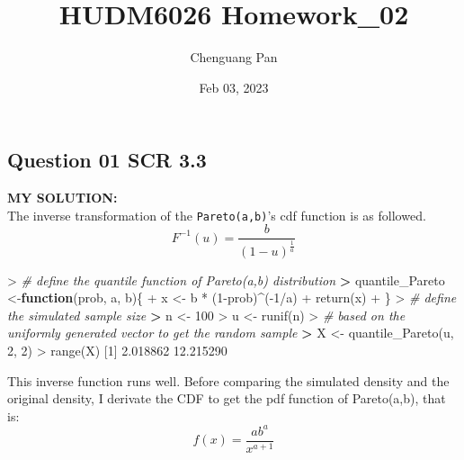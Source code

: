 \documentclass[
]{article}
\title{HUDM6026 Homework\_02}
\author{Chenguang Pan}
\date{Feb 03, 2023}
\newenvironment{Shaded}{\begin{snugshade}}{\end{snugshade}}
\newcommand{\CommentTok}[1]{\textcolor[rgb]{0.56,0.35,0.01}{\textit{#1}}}
\newcommand{\ControlFlowTok}[1]{\textcolor[rgb]{0.13,0.29,0.53}{\textbf{#1}}}
\newcommand{\DecValTok}[1]{\textcolor[rgb]{0.00,0.00,0.81}{#1}}
\newcommand{\ErrorTok}[1]{\textcolor[rgb]{0.64,0.00,0.00}{\textbf{#1}}}
\newcommand{\FloatTok}[1]{\textcolor[rgb]{0.00,0.00,0.81}{#1}}
\newcommand{\FunctionTok}[1]{\textcolor[rgb]{0.00,0.00,0.00}{#1}}
\newcommand{\NormalTok}[1]{#1}
\newcommand{\OtherTok}[1]{\textcolor[rgb]{0.56,0.35,0.01}{#1}}
\newcommand{\SpecialCharTok}[1]{\textcolor[rgb]{0.00,0.00,0.00}{#1}}
\begin{document}
\maketitle

\hypertarget{question-01-scr-3.3}{%
\subsection{Question 01 SCR 3.3}\label{question-01-scr-3.3}}

\textbf{MY SOLUTION:}\\
The inverse transformation of the \texttt{Pareto(a,b)}'s cdf function is
as followed. \[F^{-1}(u)=\frac{b}{(1-u)^\frac{1}{a}} \]

\begin{Shaded}
\begin{Highlighting}[]
\SpecialCharTok{\textgreater{}} \CommentTok{\# define the quantile function of Pareto(a,b) distribution}
\ErrorTok{\textgreater{}}\NormalTok{ quantile\_Pareto }\OtherTok{\textless{}{-}}\ControlFlowTok{function}\NormalTok{(prob, a, b)\{}
\SpecialCharTok{+}\NormalTok{   x }\OtherTok{\textless{}{-}}\NormalTok{ b }\SpecialCharTok{*}\NormalTok{ (}\DecValTok{1}\SpecialCharTok{{-}}\NormalTok{prob)}\SpecialCharTok{\^{}}\NormalTok{(}\SpecialCharTok{{-}}\DecValTok{1}\SpecialCharTok{/}\NormalTok{a)}
\SpecialCharTok{+}   \FunctionTok{return}\NormalTok{(x)}
\SpecialCharTok{+}\NormalTok{ \}}
\SpecialCharTok{\textgreater{}} \CommentTok{\# define the simulated sample size}
\ErrorTok{\textgreater{}}\NormalTok{ n }\OtherTok{\textless{}{-}} \DecValTok{100}
\SpecialCharTok{\textgreater{}}\NormalTok{ u }\OtherTok{\textless{}{-}} \FunctionTok{runif}\NormalTok{(n)}
\SpecialCharTok{\textgreater{}} \CommentTok{\# based on the uniformly generated vector to get the random sample}
\ErrorTok{\textgreater{}}\NormalTok{ X }\OtherTok{\textless{}{-}} \FunctionTok{quantile\_Pareto}\NormalTok{(u, }\DecValTok{2}\NormalTok{, }\DecValTok{2}\NormalTok{)}
\SpecialCharTok{\textgreater{}} \FunctionTok{range}\NormalTok{(X)}
\NormalTok{[}\DecValTok{1}\NormalTok{]  }\FloatTok{2.018862} \FloatTok{12.215290}
\end{Highlighting}
\end{Shaded}

This inverse function runs well. Before comparing the simulated density
and the original density, I derivate the CDF to get the pdf function of
Pareto(a,b), that is:\[f(x)=\frac{ab^a}{x^{a+1}}\]
\end{document}

